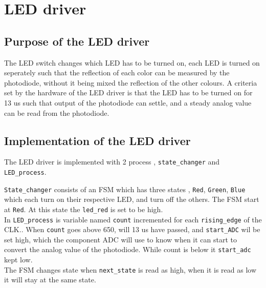 \section{LED driver}
\subsection{Purpose of the LED driver}
The LED switch  changes which LED has to be turned on, each LED is turned on seperately such that the reflection of each color can be measured by the photodiode, without it being mixed the reflection of the other colours.  A criteria set by the hardware of the LED driver is that the LED has to be turned on for 13 us such that output of the photodiode can settle, and a steady analog value can be read from the photodiode. 
\subsection{Implementation of the LED driver}


The LED driver is implemented with 2 process , \texttt{state\_changer} and \texttt{LED\_process}. 

\texttt{State\_changer} consists of an  FSM which has three states , \texttt{Red}, \texttt{Green}, \texttt{Blue} which each turn on their respective LED, and turn off the others.  The FSM start at \texttt{Red}.  At this state the \texttt{led\_red} is set to be high.\\


In \texttt{LED\_process}  is  variable named \texttt{count} incremented for each \texttt{rising\_edge} of the CLK..  When \texttt{count} goes above 650, will 13 us have passed, and  \texttt{start\_ADC} wil be set high, which the component ADC will use to know when it can start to convert the analog value of the photodiode. While count is below it \texttt{start\_adc} kept low.  \\

The FSM changes state when \texttt{next\_state} is read as high,  when it is read as low it will stay at the same state. 



